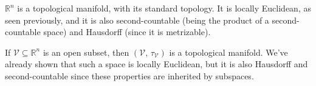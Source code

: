 \documentclass{article}
\theoremstyle{plain}
\theoremstyle{normal}
\newenvironment{example}{%
    \pushQED{\qed}\renewcommand{\qedsymbol}{$\blacksquare$}\examplex%
}{%
    \popQED\endexamplex%
}
\begin{document}
        \begin{example}
            $\mathbb{R}^{n}$ is a topological manifold, with its standard
            topology. It is locally Euclidean, as seen previously, and it is
            also second-countable (being the product of a second-countable
            space) and Hausdorff (since it is metrizable).
        \end{example}
        \begin{example}
            If $\mathcal{V}\subseteq\mathbb{R}^{n}$ is an open subset, then
            $(\mathcal{V},\,\tau_{\mathcal{V}})$ is a topological manifold.
            We've already shown that such a space is locally Euclidean, but it
            is also Hausdorff and second-countable since these properties are
            inherited by subspaces.
        \end{example}
\end{document}
